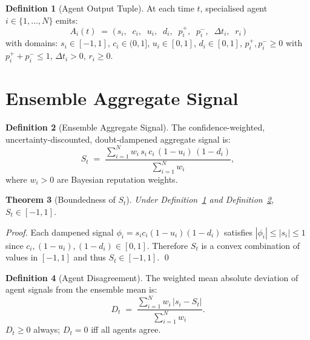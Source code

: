 \documentclass[12pt,openany]{book}
\newcommand{\calA}{\mathcal{A}}
\numberwithin{equation}{chapter}
\theoremstyle{plain}
\newtheorem{theorem}{Theorem}[chapter]
\theoremstyle{definition}
\newtheorem{definition}[theorem]{Definition}
\theoremstyle{remark}
\def\mathcal#1{#1}%
\begin{document}
\begin{definition}[Agent Output Tuple]
\label{def:agent-tuple}
At each time $t$, specialised agent $i \in \{1,\ldots,N\}$ emits:
\begin{equation}
  \calA_i(t)
  \;=\;
  \bigl(\,s_i,\;\; c_i,\;\; u_i,\;\; d_i,\;\;
         p_i^{+},\;\; p_i^{-},\;\; \Delta t_i,\;\; r_i\,\bigr)
  \label{eq:agent-tuple}
\end{equation}
with domains: $s_i \in [-1,1]$, $c_i \in (0,1]$,
$u_i \in [0,1]$, $d_i \in [0,1]$, $p_i^+,p_i^- \geq 0$ with
$p_i^+ + p_i^- \leq 1$, $\Delta t_i > 0$, $r_i \geq 0$.
\end{definition}

\section{Ensemble Aggregate Signal}

\begin{definition}[Ensemble Aggregate Signal]
\label{def:ensemble-signal}
The confidence-weighted, uncertainty-discounted, doubt-dampened
aggregate signal is:
\begin{equation}
  S_t
  \;=\;
  \frac{\displaystyle\sum_{i=1}^{N}
        w_i\,s_i\,c_i\,(1-u_i)\,(1-d_i)}
       {\displaystyle\sum_{i=1}^{N} w_i},
  \label{eq:ensemble-signal}
\end{equation}
where $w_i > 0$ are Bayesian reputation weights.
\end{definition}

\begin{theorem}[Boundedness of $S_t$]
\label{thm:signal-bounded}
Under Definition~\ref{def:agent-tuple} and
Definition~\ref{def:ensemble-signal}, $S_t \in [-1,1]$.
\end{theorem}

\begin{proof}
Each dampened signal $\phi_i = s_i c_i(1-u_i)(1-d_i)$ satisfies
$|\phi_i| \leq |s_i| \leq 1$ since $c_i, (1-u_i), (1-d_i) \in [0,1]$.
Therefore $S_t$ is a convex combination of values in $[-1,1]$ and
thus $S_t \in [-1,1]$.
\qed
\end{proof}

\begin{definition}[Agent Disagreement]
\label{def:disagreement}
The weighted mean absolute deviation of agent signals from the
ensemble mean is:
\begin{equation}
  D_t \;=\;
  \frac{\displaystyle\sum_{i=1}^{N} w_i\,|s_i - S_t|}
       {\displaystyle\sum_{i=1}^{N} w_i}.
  \label{eq:disagreement}
\end{equation}
$D_t \geq 0$ always; $D_t = 0$ iff all agents agree.
\end{definition}
\end{document}
